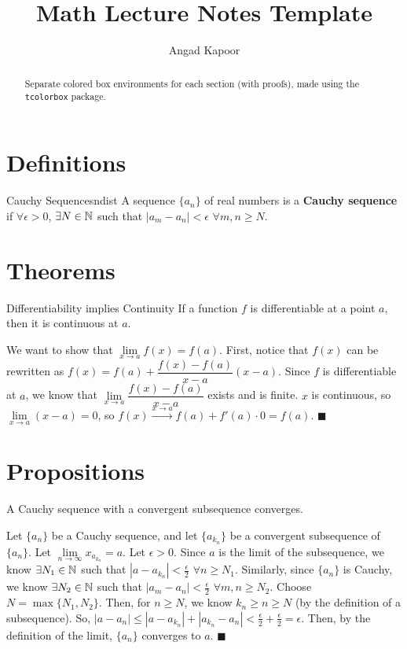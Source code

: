 \documentclass[a4paper,12pt]{article}
\title{\textbf{Math Lecture Notes Template}}
\author{Angad Kapoor}
\date{}
\begin{document}
\maketitle
\begin{abstract}
    Separate colored box environments for each section (with proofs), made using the \verb|tcolorbox| package.
\end{abstract}
\tableofcontents

\linediv

\thispagestyle{empty}

\section{Definitions}
\begin{definition}{Cauchy Sequences}{ndist}
    A sequence $\{a_n\}$ of real numbers is a \textbf{Cauchy sequence} if $\forall \epsilon > 0$, $\exists N\in\mathbb{N}$ such that $|a_m - a_n| < \epsilon$ $\forall m,n \geq N$.
\end{definition}

\section{Theorems}
\begin{theorem}{Differentiability implies Continuity}{}
    If a function $f$ is differentiable at a point $a$, then it is continuous at $a$.
\end{theorem}
\begin{tproof*}{}{}
    We want to show that $\lim\limits_{x\to a}f(x) = f(a)$. 
    First, notice that $f(x)$ can be rewritten as $f(x) = f(a) + \dfrac{f(x) - f(a)}{x-a}(x-a)$. 
    Since $f$ is differentiable at $a$, we know that $\lim\limits_{x\to a}\dfrac{f(x) - f(a)}{x-a}$ exists and is finite.
    $x$ is continuous, so $\lim\limits_{x\to a} (x-a) = 0$, so $f(x) \xrightarrow{x\to a} f(a) + f'(a)\cdot 0 = f(a)$. $\blacksquare$
\end{tproof*}

\section{Propositions}
\begin{proposition}{}{}
    A Cauchy sequence with a convergent subsequence converges.
\end{proposition}
\begin{pproof*}{}{}
    Let $\{a_n\}$ be a Cauchy sequence, and let $\{a_{k_n}\}$ be a convergent subsequence of $\{a_n\}$.
    Let $\lim\limits_{n\to\infty}x_{a_{k_n}} = a$.
    Let $\epsilon > 0$.
    Since $a$ is the limit of the subsequence, we know $\exists N_1\in\mathbb{N}$ such that $|a - a_{k_n}| < \frac{\epsilon}{2}$ $\forall n\geq N_1$.
    Similarly, since $\{a_n\}$ is Cauchy, we know $\exists N_2\in\mathbb{N}$ such that $|a_m - a_n| < \frac{\epsilon}{2}$ $\forall m,n\geq N_2$.
    Choose $N = \max\{N_1, N_2\}$.
    Then, for $n\geq N$, we know $k_n \geq n \geq N$ (by the definition of a subsequence). 
    So, $|a - a_n| \leq |a - a_{k_n}| + |a_{k_n} - a_n| < \frac{\epsilon}{2} + \frac{\epsilon}{2} = \epsilon$.
    Then, by the definition of the limit, $\{a_n\}$ converges to $a$. $\blacksquare$
\end{pproof*}
\end{document}
